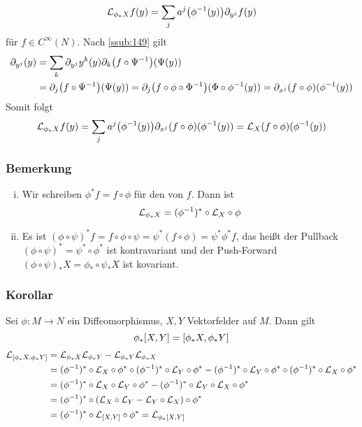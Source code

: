 \begin{enumerate}[(i)]
\[\mathcal{L}_{\phi_* X} f(y) = \sum_j a^j\enbrace*{\phi^{-1}(y)} \partial_{y^j} f(y)
\]
für $f\in C^\infty (N)$. Nach \ref{ssub:149} gilt
\begin{align*}
\partial_{y^j}(y) &= \sum_k \partial_{y^j}y^k(y)\partial_k \enbrace*{f\circ \Psi^{-1}}(\Psi(y))\\
&= \partial_j \enbrace*{f\circ \Psi^{-1}}(\Psi(y)) = \partial_j \enbrace*{f\circ \phi\circ \Phi^{-1}}(\Phi\circ \phi^{-1}(y)) = \partial_{x^j}(f\circ \phi)(\phi^{-1}(y))
\end{align*}
Somit folgt
\[
\mathcal{L}_{\phi_* X} f(y) = \sum_j a^j \enbrace*{\phi^{-1}(y)}\partial_{x^j}(f\circ \phi) (\phi^{-1}(y)) = \mathcal{L}_X (f\circ \phi)(\phi^{-1}(y))
\]
\end{enumerate}

\subsubsection{Bemerkung}
\label{ssub:164}
\begin{enumerate}[(i)]
\item Wir schreiben $\phi^* f = f\circ \phi$ für den  von $f$. Dann ist
\[
\mathcal{L}_{\phi_* X} = (\phi^{-1})^* \circ \mathcal{L}_X \circ \phi
\]
\item Es ist $(\phi\circ \psi)^* f = f\circ \phi\circ \psi = \psi^*(f\circ \phi) = \psi^* \phi^* f$, das heißt der Pullback $(\phi\circ \psi)^* = \psi^* \circ \phi^*$ ist kontravariant und der Push-Forward $(\phi\circ \psi)_* X = \phi_* \circ \psi_* X$ ist kovariant.
\end{enumerate}

\subsubsection{Korollar}
\label{ssub:165}
Sei $\phi: M\to N$ ein Diffeomorphismus, $X,Y$ Vektorfelder auf $M$. Dann gilt
\[
\phi_*\benbrace*{X,Y} = \benbrace{\phi_* X,\phi_* Y}
\]
\begin{align*}
\mathcal{L}_{[\phi_* X, \phi_* Y]} &= \mathcal{L}_{\phi_* X} \mathcal{L}_{\phi_* Y} - \mathcal{L}_{\phi_* Y} \mathcal{L}_{\phi_* X}\\
&= (\phi^{-1})^* \circ \mathcal{L}_{X} \circ \phi^* \circ (\phi^{-1})^* \circ \mathcal{L}_{Y} \circ \phi^* - (\phi^{-1})^* \circ \mathcal{L}_{Y} \circ \phi^* \circ (\phi^{-1})^* \circ \mathcal{L}_{X} \circ \phi^*\\
&= (\phi^{-1})^* \circ \mathcal{L}_{X} \circ \mathcal{L}_{Y} \circ \phi^* - (\phi^{-1})^* \circ \mathcal{L}_{Y} \circ \mathcal{L}_{X} \circ \phi^*\\
&= (\phi^{-1})^* \circ (\mathcal{L}_{X} \circ \mathcal{L}_{Y} - \mathcal{L}_{Y} \circ \mathcal{L}_{X}) \circ \phi^*\\
&= (\phi^{-1})^* \circ \mathcal{L}_{[X,Y]} \circ \phi^* = \mathcal{L}_{\phi_* [X,Y]}
\end{align*}

